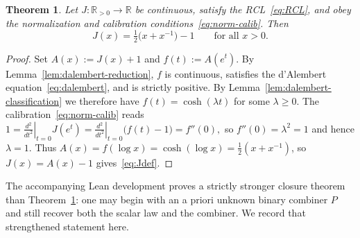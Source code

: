 \documentclass[11pt,reqno]{amsart}
\theoremstyle{plain}
\newtheorem{theorem}{Theorem}[section]
\theoremstyle{definition}
\theoremstyle{remark}
\newcommand{\Jcost}{J}
\newcommand{\RR}{\mathbb{R}}
\newcommand{\1}{\mathbf{1}}
\newcommand{\paperadd}[1]{{\color{paperblue}#1}}
\begin{document}
\begin{theorem}\label{thm:T5}
Let $\Jcost:\RR_{>0}\to\RR$ be continuous, satisfy the
RCL~\eqref{eq:RCL}, and obey the normalization and calibration
conditions~\eqref{eq:norm-calib}. Then
\begin{equation}\label{eq:Jdef}
\Jcost(x)=\tfrac12\bigl(x+x^{-1}\bigr)-1 \qquad\text{for all } x>0.
\end{equation}
\end{theorem}

\begin{proof}
Set $A(x):=\Jcost(x)+1$ and $f(t):=A(e^t)$. By Lemma~\ref{lem:dalembert-reduction},
$f$ is continuous, satisfies the d'Alembert equation~\eqref{eq:dalembert}, and is strictly positive.
By Lemma~\ref{lem:dalembert-classification} we therefore have $f(t)=\cosh(\lambda t)$ for some $\lambda\ge 0$.
The calibration~\eqref{eq:norm-calib} reads
\(
1=\left.\frac{d^2}{dt^2}\right|_{t=0}\Jcost(e^t)
=\left.\frac{d^2}{dt^2}\right|_{t=0}\bigl(f(t)-1\bigr)
=f''(0),
\)
so $f''(0)=\lambda^2=1$ and hence $\lambda=1$.
Thus $A(x)=f(\log x)=\cosh(\log x)=\tfrac12(x+x^{-1})$, so $\Jcost(x)=A(x)-1$ gives~\eqref{eq:Jdef}.
\end{proof}

\paperadd{The accompanying Lean development proves a strictly stronger closure theorem than Theorem~\ref{thm:T5}: one may begin with an a priori unknown binary combiner \(P\) and still recover both the scalar law and the combiner. We record that strengthened statement here.}
\end{document}
